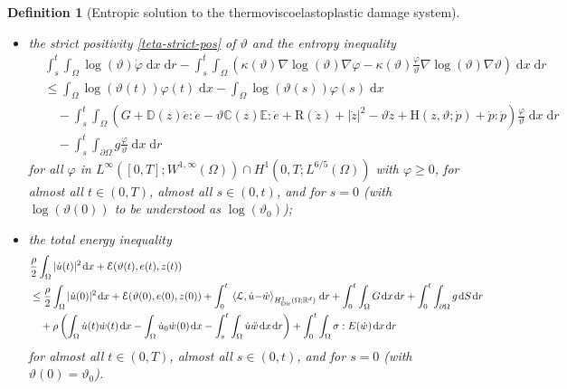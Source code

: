 \documentclass[a4paper,10pt,reqno]{amsart}
\numberwithin{equation}{section}
\newcommand{\R}{\mathbb{R}}
\numberwithin{equation}{section}
\newtheorem{definition}[theorem]{Definition}
\def\dd{\;\!\mathrm{d}} %
\newcommand{\pairing}[4]{ \sideset{_{ #1 }}{_{ #2 }}  {\mathop{\langle #3 , #4
\rangle}}}
\newcommand{\teta}{\vartheta}
\newcommand{\sig}[1]{E(#1)}
\newcommand{\Dir}{\mathrm{Dir}}
\newcommand{\condu}{\kappa}
\newcommand{\dip}[3]{\mathrm{H}(#1,#2;#3)}
\newcommand{\did}[1]{\mathrm{R}(#1)}
\begin{document}
\begin{definition}[Entropic solution to the thermoviscoelastoplastic damage system]
\begin{itemize}
for every $t\in (0,T]$;
   \item[-]
 the \emph{strict positivity} \eqref{teta-strict-pos} of $\teta$ and 
  the \emph{entropy inequality}
 \begin{equation}
\label{entropy-ineq}
\begin{aligned}
  & \int_s^t \int_\Omega  \log(\teta) \dot{\varphi} \dd x \dd r -   \int_s^t \int_\Omega \left( \condu(\teta) \nabla \log(\teta) \nabla \varphi - \condu(\teta) \frac\varphi\teta \nabla \log(\teta) \nabla \teta\right)   \dd x \dd r  
  \\ 
& \leq
  \int_\Omega \log(\teta(t)) \varphi(t) \dd x -  \int_\Omega \log(\teta(s)) \varphi(s) \dd x  \\ & \quad
    - \int_s^t \int_\Omega \left( G+ 
    \mathbb{D}(z) \dot{e} : \dot{e} -\teta \mathbb{C}(z)\mathbb{E}  : \dot{e}
+ \did {\dot z} + |\dot z|^2 -\teta \dot z 
+ \dip{z}{\teta}{\dot{p}} + \dot{p}: \dot{p}
 \right) \frac{\varphi}\teta \dd x \dd r
 \\ & \quad   - \int_s^t \int_{\partial\Omega} g \frac\varphi\teta \dd x \dd r
\end{aligned}
\end{equation}
for all $\varphi $ in $L^\infty ([0,T]; W^{1,\infty}(\Omega)) \cap H^1 (0,T; L^{6/5}(\Omega))$  with $\varphi \geq 0$, 
for almost all $t\in (0,T)$, almost all $s\in (0,t)$, and for $s=0$ (with $\log(\teta(0))$ to be understood as $\log(\teta_0)$);
\item[-] the \emph{total energy inequality}
\begin{equation}
\label{total-uee}
\begin{aligned}
& 
\frac{\rho}2 \int_\Omega |\dot{u}(t)|^2 \dd x +\mathcal{E}(\teta(t), e(t), z(t)) 
\\
&  \leq \frac{\rho}2 \int_\Omega |\dot{u}(0)|^2 \dd x +\mathcal{E}(\teta(0), e(0),z(0))  + \int_0^t \pairing{}{H_\Dir^1 (\Omega;\R^d)}{\mathcal{L}}{\dot u{-} \dot w}  \dd r 
  +\int_0^t \int_\Omega G \dd x \dd r + \int_0^t \int_{\partial\Omega} g \dd S \dd r
\\
& \quad   +\rho \left( \int_\Omega \dot{u}(t) \dot{w}(t) \dd x -  \int_\Omega \dot{u}_0 \dot{w}(0) \dd x - \int_s^t \int_\Omega \dot{u}\ddot w \dd x \dd r \right)     + 
\int_0^t \int_\Omega \sigma: \sig{\dot w} \dd x \dd r
 \end{aligned}
 \end{equation}
 for almost all $t\in (0,T)$, almost all $s\in (0,t)$, and for $s=0$ (with $\teta(0)=\teta_0$).
\end{itemize}
\end{definition}
\end{document}
